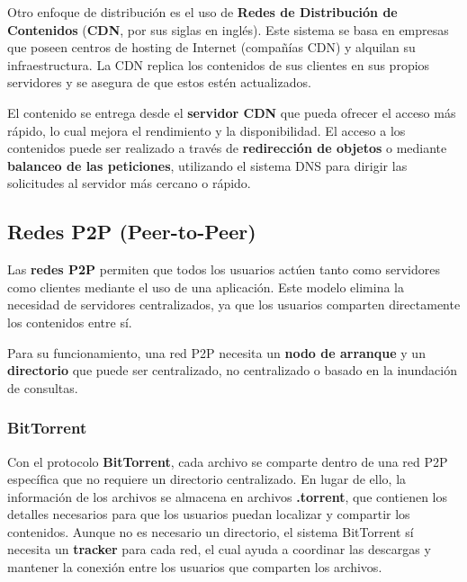 \documentclass{article}
\begin{document}
Otro enfoque de distribución es el uso de \textbf{Redes de Distribución de Contenidos} (\textbf{CDN}, por sus siglas en inglés). Este sistema se basa en empresas que poseen centros de hosting de Internet (compañías CDN) y alquilan su infraestructura. La CDN replica los contenidos de sus clientes en sus propios servidores y se asegura de que estos estén actualizados. 

El contenido se entrega desde el \textbf{servidor CDN} que pueda ofrecer el acceso más rápido, lo cual mejora el rendimiento y la disponibilidad. El acceso a los contenidos puede ser realizado a través de \textbf{redirección de objetos} o mediante \textbf{balanceo de las peticiones}, utilizando el sistema DNS para dirigir las solicitudes al servidor más cercano o rápido.

\subsection{Redes P2P (Peer-to-Peer)}

Las \textbf{redes P2P} permiten que todos los usuarios actúen tanto como servidores como clientes mediante el uso de una aplicación. Este modelo elimina la necesidad de servidores centralizados, ya que los usuarios comparten directamente los contenidos entre sí.

Para su funcionamiento, una red P2P necesita un \textbf{nodo de arranque} y un \textbf{directorio} que puede ser centralizado, no centralizado o basado en la inundación de consultas.

\subsubsection{BitTorrent}

Con el protocolo \textbf{BitTorrent}, cada archivo se comparte dentro de una red P2P específica que no requiere un directorio centralizado. En lugar de ello, la información de los archivos se almacena en archivos \textbf{.torrent}, que contienen los detalles necesarios para que los usuarios puedan localizar y compartir los contenidos. Aunque no es necesario un directorio, el sistema BitTorrent sí necesita un \textbf{tracker} para cada red, el cual ayuda a coordinar las descargas y mantener la conexión entre los usuarios que comparten los archivos.
\end{document}

